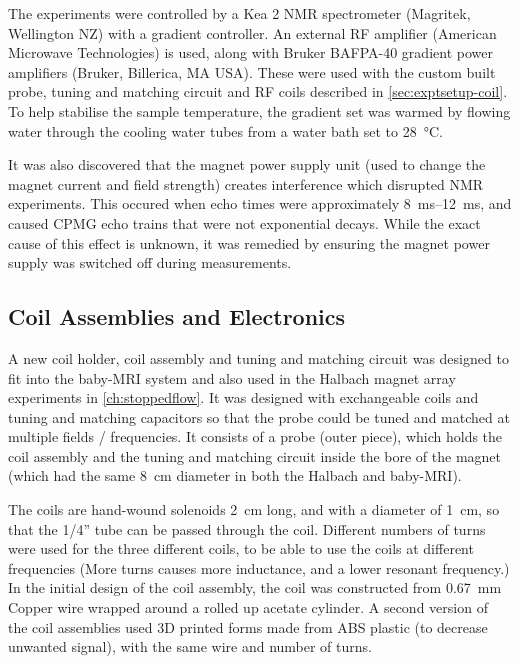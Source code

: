 The experiments were controlled by a Kea 2 NMR spectrometer (Magritek, Wellington NZ) with a gradient controller.
An external RF amplifier (American Microwave Technologies) is used, along with Bruker BAFPA-40 gradient power amplifiers (Bruker, Billerica, MA USA).
These were used with the custom built probe, tuning and matching circuit and RF coils described in \autoref{sec:exptsetup-coil}.
To help stabilise the sample temperature, the gradient set was warmed by flowing water through the cooling water tubes from a water bath set to \SI{28}{\celsius}.

It was also discovered that the magnet power supply unit (used to change the magnet current and field strength) creates interference which disrupted NMR experiments.
This occured when echo times were approximately \SIrange{8}{12}{ms}, and caused CPMG echo trains that were not exponential decays.
While the exact cause of this effect is unknown, it was remedied by ensuring the magnet power supply was switched off during measurements.

\subsection{Coil Assemblies and Electronics}
\label{sec:exptsetup-coil}
A new coil holder, coil assembly and tuning and matching circuit was designed to fit into the baby-MRI system and also used in the Halbach magnet array experiments in  \autoref{ch:stoppedflow}.
It was designed with exchangeable coils and tuning and matching capacitors so that the probe could be tuned and matched at multiple fields / frequencies.
It consists of a probe (outer piece), which holds the coil assembly and the tuning and matching circuit inside the bore of the magnet (which had the same \SI{8}{cm} diameter in both the Halbach and baby-MRI).

The coils are hand-wound solenoids \SI{2}{cm} long, and with a diameter of \SI{1}{cm}, so that the 1/4'' tube can be passed through the coil.
Different numbers of turns were used for the three different coils, to be able to use the coils at different frequencies (More turns causes more inductance, and a lower resonant frequency.)
In the initial design of the coil assembly, the coil was constructed from \SI{0.67}{mm} Copper wire wrapped around a rolled up acetate cylinder.
A second version of the coil assemblies used 3D printed forms made from ABS plastic (to decrease unwanted signal), with the same wire and number of turns.


